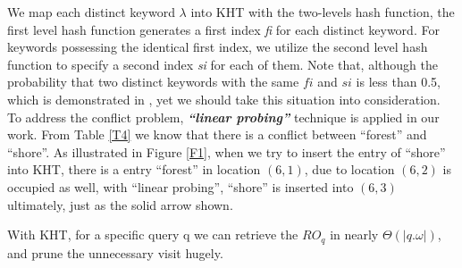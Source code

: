 We map each distinct keyword $\lambda$ into KHT with the two-levels hash function, the first level hash function generates a first index \textit{fi} for each distinct keyword. For keywords possessing the identical first index, we utilize the second level hash function to specify a second index \textit{si} for each of them. Note that, although the probability that two distinct keywords with the same $fi$ and $si$ is less than 0.5, which is demonstrated in \cite{cormen2001introduction}, yet we should take this situation into consideration. To address the conflict problem, \textbf{\textit{``linear probing''}} technique is applied in our work. From Table \ref{T4} we know that there is a conflict between ``forest'' and ``shore''. As illustrated in Figure \ref{F1}, when we try to insert the entry of ``shore'' into KHT, there is a entry ``forest'' in location $(6,1)$, due to location $(6,2)$ is occupied as well, with ``linear probing'', ``shore'' is inserted into $(6,3)$ ultimately, just as the solid arrow shown.

With KHT, for a specific query q we can retrieve the $RO_q$ in nearly $\Theta(|q.\omega|)$, and prune the unnecessary visit hugely.









